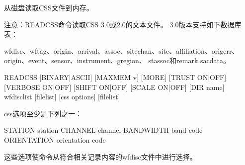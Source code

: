 \label{cmd:readcss}

%
从磁盘读取CSS文件到内存。

注意：READCSS命令读取CSS 3.0或2.0的文本文件。
3.0版本支持如下数据库表：

wfdisc、wftag、origin、arrival、assoc、sitechan、site、affiliation、origerr、origin、event、sensor、instrument、gregion、
stassoc和remark sacdata。

\begin{SACSTX}
READCSS [BINARY|ASCII] [MAXMEM v] [MORE] [TRUST ON|OFF]
[VERBOSE ON|OFF] [SHIFT ON|OFF] [SCALE ON|OFF] %
[DIR name] wfdisclist [filelist] [css options] [filelist]
\end{SACSTX}

css选项至少是下列之一：

\begin{SACSTX}
STATION station
CHANNEL channel
BANDWIDTH band code
ORIENTATION orientation code
\end{SACSTX}

这些选项使命令从符合相关记录内容的wfdisc文件中进行选择。

